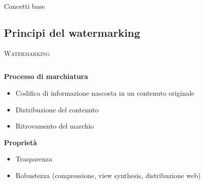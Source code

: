 \documentclass{beamer}
\begin{document}
\begin{section}{Concetti base}


\subsection {Principi del watermarking}
\begin{frame}[t]{\textsc{Watermarking}}
\begin{columns}
\begin{column}{5cm}
\vspace{1em}
\textbf{Processo di marchiatura}
\begin{itemize}
\item Codifica di informazione nascosta in un contenuto originale
\item Distribuzione del contenuto
\item Ritrovamento del marchio
\end{itemize}
\textbf{Propriet\`{a}}
\begin{itemize}
\item Trasparenza
\item Robustezza (\small{compressione, view synthesis, distribuzione web})
\end{itemize}
\end{column}
\begin{column}{5cm}
\centering

\end{column}
\end{columns}
\end{frame}
\end{section}
\end{document}
